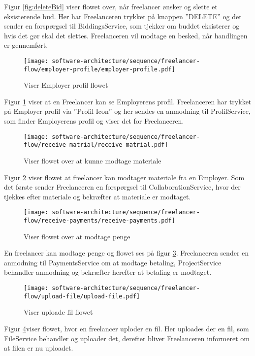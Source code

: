 Figur \ref{fig:deleteBid} viser flowet over, når freelancer ønsker og slette et eksisterende bud. Her har Freelanceren trykket på knappen ''DELETE'' og det sender en forspørgsel til BiddingsService, som tjekker om buddet eksisterer og hvis det gør skal det slettes. Freelanceren vil modtage en besked, når handlingen er gennemført. 


\begin{figure}[H]
    \centering
\texttt{[image: software-architecture/sequence/freelancer-flow/employer-profile/employer-profile.pdf]}
\caption{Viser Employer profil flowet}
\label{fig:profile}
\end{figure}
Figur \ref{fig:profile} viser at en Freelancer kan se Employerens profil. Freelanceren har trykket på Employer profil via ''Profil Icon'' og her sendes en anmodning til ProfilService, som finder Employerens profil og viser det for Freelanceren.

\begin{figure}[H]
    \centering
\texttt{[image: software-architecture/sequence/freelancer-flow/receive-matrial/receive-matrial.pdf]}
\caption{Viser flowet over at kunne modtage materiale}
\label{fig:materiale}
\end{figure}
Figur \ref{fig:materiale} viser flowet at freelancer kan modtager materiale fra en Employer. Som det første sender Freelanceren en forspørgsel til CollaborationService, hvor der tjekkes efter materiale og bekræfter at materiale er modtaget. 


\begin{figure}[H]
    \centering
\texttt{[image: software-architecture/sequence/freelancer-flow/receive-payments/receive-payments.pdf]}
\caption{Viser flowet over at modtage penge}
\label{fig:receivePayments}
\end{figure}
En freelancer kan modtage penge og flowet ses på figur \ref{fig:receivePayments}. Freelanceren sender en anmodning til PaymentsService om at modtage betaling, ProjectService behandler anmodning og bekræfter herefter at betaling er modtaget. 

\begin{figure}[H]
    \centering
\texttt{[image: software-architecture/sequence/freelancer-flow/upload-file/upload-file.pdf]}
\caption{Viser uploade fil flowet}
\label{fig:uploadeFile}
\end{figure}
Figur \ref{fig:uploadeFile}viser flowet, hvor en freelancer uploder en fil. Her uploades der en fil, som FileService behandler og uploader det, derefter bliver Freelanceren informeret om at filen er nu uploadet. 


